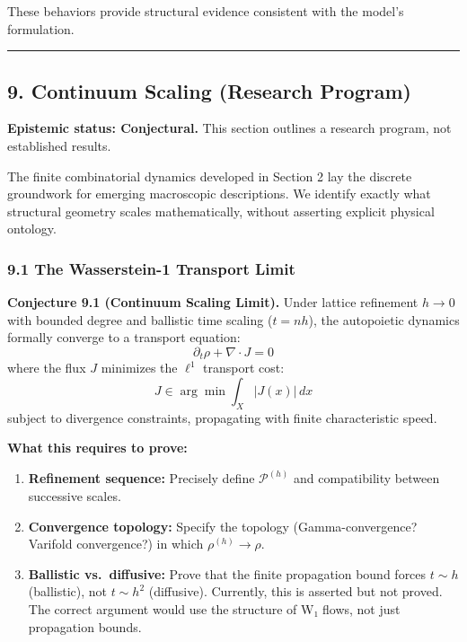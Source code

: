 \documentclass[
]{article}
\providecommand{\tightlist}{%
  \setlength{\itemsep}{0pt}\setlength{\parskip}{0pt}}
\begin{document}
These behaviors provide structural evidence consistent with the model's
formulation.

\begin{center}\rule{0.5\linewidth}{0.5pt}\end{center}

\subsection{9. Continuum Scaling (Research
Program)}\label{continuum-scaling-research-program}

\textbf{Epistemic status: Conjectural.} This section outlines a research
program, not established results.

The finite combinatorial dynamics developed in Section 2 lay the
discrete groundwork for emerging macroscopic descriptions. We identify
exactly what structural geometry scales mathematically, without
asserting explicit physical ontology.

\subsubsection{9.1 The Wasserstein-1 Transport
Limit}\label{the-wasserstein-1-transport-limit}

\textbf{Conjecture 9.1 (Continuum Scaling Limit).} Under lattice
refinement \(h \to 0\) with bounded degree and ballistic time scaling
(\(t = nh\)), the autopoietic dynamics formally converge to a transport
equation: \[\partial_t \rho + \nabla \cdot J = 0\] where the flux \(J\)
minimizes the \(\ell^1\) transport cost:
\[J \in \arg\min \int_{X} |J(x)| \, dx\] subject to divergence
constraints, propagating with finite characteristic speed.

\textbf{What this requires to prove:}

\begin{enumerate}
\def\labelenumi{\arabic{enumi}.}
\tightlist
\item
  \textbf{Refinement sequence:} Precisely define \(\mathcal{P}^{(h)}\)
  and compatibility between successive scales.
\item
  \textbf{Convergence topology:} Specify the topology
  (Gamma-convergence? Varifold convergence?) in which
  \(\rho^{(h)} \to \rho\).
\item
  \textbf{Ballistic vs.~diffusive:} Prove that the finite propagation
  bound forces \(t \sim h\) (ballistic), not \(t \sim h^2\) (diffusive).
  Currently, this is asserted but not proved. The correct argument would
  use the structure of W₁ flows, not just propagation bounds.
\end{enumerate}
\end{document}
